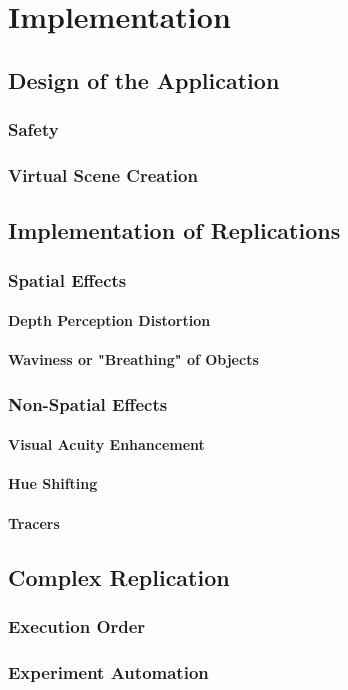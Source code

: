 \chapter{Implementation}
\vspace{-1.6em}
%

\minitoc
\thispagestyle{empty}
\newpage

\section{Design of the Application}
\subsection{Safety}
\subsection{Virtual Scene Creation}
\section{Implementation of Replications}
\subsection{Spatial Effects}
\subsubsection{Depth Perception Distortion}

\autocite{fischer1970psilocybin}

\subsubsection{Waviness or "Breathing" of Objects}
\subsection{Non-Spatial Effects}
\subsubsection{Visual Acuity Enhancement}
\subsubsection{Hue Shifting}
\subsubsection{Tracers}
\section{Complex Replication}
\subsection{Execution Order}
\subsection{Experiment Automation}\label{sec:experiment_automation}
